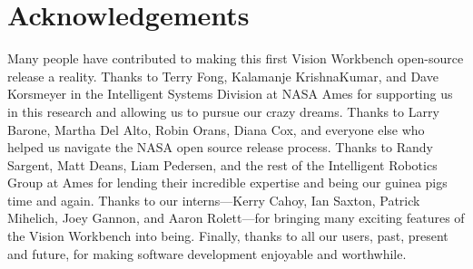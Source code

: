 \chapter*{Acknowledgements}

Many people have contributed to making this first Vision Workbench
open-source release a reality.  Thanks to Terry Fong, Kalamanje
KrishnaKumar, and Dave Korsmeyer in the Intelligent Systems Division
at NASA Ames for supporting us in this research and allowing us to
pursue our crazy dreams.  Thanks to Larry Barone, Martha Del Alto,
Robin Orans, Diana Cox, and everyone else who helped us navigate the
NASA open source release process.  Thanks to Randy Sargent, Matt
Deans, Liam Pedersen, and the rest of the Intelligent Robotics Group
at Ames for lending their incredible expertise and being our guinea
pigs time and again.  Thanks to our interns---Kerry Cahoy, Ian Saxton,
Patrick Mihelich, Joey Gannon, and Aaron Rolett---for bringing many
exciting features of the Vision Workbench into being.  Finally, thanks
to all our users, past, present and future, for making software
development enjoyable and worthwhile.
